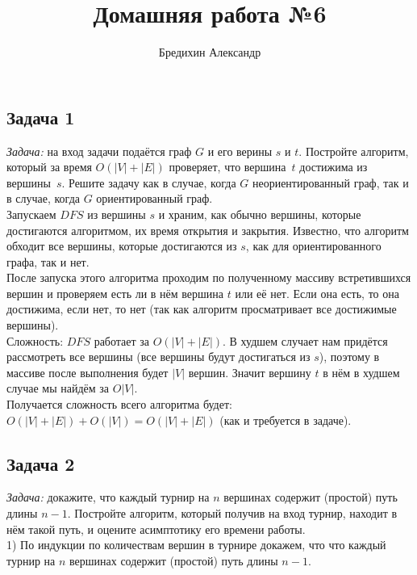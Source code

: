 \documentclass[a4paper,12pt]{article} %
\author{Бредихин Александр}
\title{Домашняя работа №6}
\begin{document}
\maketitle

\subsection*{Задача 1}
\textit{Задача:} на вход задачи подаётся граф $G$ и его верины $s$ и $t$. Постройте алгоритм, который за время $O(|V| + |E|)$ проверяет, что вершина~$t$ достижима из вершины~$s$. Решите задачу как в случае, когда $G$ неориентированный граф, так и в случае, когда $G$ ориентированный граф.\\

Запускаем $ DFS $ из вершины $ s $ и храним, как обычно вершины, которые достигаются алгоритмом, их время открытия и закрытия. Известно, что алгоритм обходит все вершины, которые достигаются из $ s $, как для ориентированного графа, так и нет.\\

После запуска этого алгоритма проходим по полученному массиву встретившихся вершин и проверяем есть ли в нём вершина $ t $ или её нет. Если она есть, то она достижима, если нет, то нет (так как алгоритм просматривает все достижимые вершины).\\

Сложность: $ DFS $ работает за $ O(|V| + |E|) $. В худшем случает нам придётся рассмотреть все вершины (все вершины будут достигаться из $ s $), поэтому в массиве после выполнения будет $ |V| $ вершин. Значит вершину $ t $ в нём в худшем случае мы найдём за $ O|V| $.\\
Получается сложность всего алгоритма будет: $ O(|V| + |E|) + O(|V|) = O(|V| + |E|) $ (как и требуется в задаче).


\subsection*{Задача 2}
\textit{Задача:} докажите, что каждый турнир на $n$ вершинах содержит (простой) путь длины $n-1$. Постройте алгоритм, который получив на вход турнир, находит в нём такой путь, и оцените асимптотику его времени работы.\\

1) По индукции по количествам вершин в турнире докажем, что что каждый турнир на $n$ вершинах содержит (простой) путь длины $n-1$.\\
\end{document}
